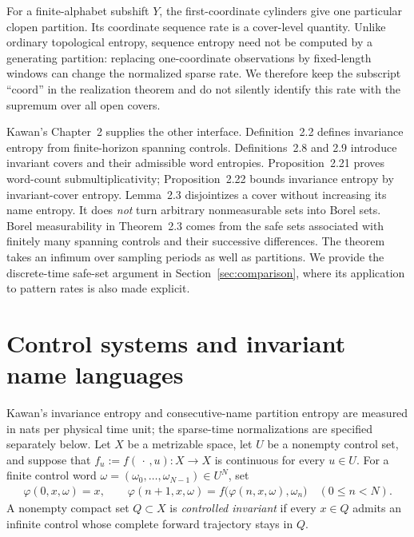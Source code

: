 \documentclass[11pt,reqno]{amsart}
\numberwithin{equation}{section}
\theoremstyle{definition}
\begin{document}
For a finite-alphabet subshift $Y$, the first-coordinate cylinders give
one particular clopen partition. Its coordinate sequence rate is a
cover-level quantity. Unlike ordinary topological entropy, sequence
entropy need not be computed by a generating partition: replacing
one-coordinate observations by fixed-length windows can change the
normalized sparse rate. We therefore keep the subscript
``$\mathrm{coord}$'' in the realization theorem and do not silently
identify this rate with the supremum over all open covers.

Kawan's Chapter~2 supplies the other interface. Definition~2.2 defines
invariance entropy from finite-horizon spanning controls.
Definitions~2.8 and 2.9 introduce invariant covers and their admissible
word entropies. Proposition~2.21 proves word-count submultiplicativity;
Proposition~2.22 bounds invariance entropy by invariant-cover entropy.
Lemma~2.3 disjointizes a cover without increasing its name entropy.
It does \emph{not} turn arbitrary nonmeasurable sets into Borel sets.
Borel measurability in Theorem~2.3 comes from the safe sets associated
with finitely many spanning controls and their successive differences.
The theorem takes an infimum over sampling periods as well as
partitions. We provide the discrete-time safe-set argument in
Section~\ref{sec:comparison}, where its application to pattern rates is
also made explicit.

\section{Control systems and invariant name languages}\label{sec:control}

Kawan's invariance entropy and consecutive-name partition entropy are measured in nats
per physical time unit; the sparse-time normalizations are specified
separately below.  Let $X$ be a
metrizable space, let $U$ be a nonempty control set, and suppose that
$f_u:=f(\,\cdot\,,u):X\to X$ is continuous for every $u\in U$.  For a finite
control word $\omega=(\omega_0,\ldots,\omega_{N-1})\in U^N$, set
\begin{align*}
 \varphi(0,x,\omega)=x,
 \qquad
 \varphi(n+1,x,\omega)
 =f\bigl(\varphi(n,x,\omega),\omega_n\bigr)
 \quad(0\le n<N).
\end{align*}
A nonempty compact set $Q\subset X$ is \emph{controlled invariant} if every
$x\in Q$ admits an infinite control whose complete forward trajectory stays in
$Q$.
\end{document}
